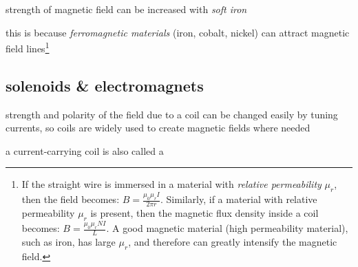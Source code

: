 \cmt strength of magnetic field can be increased with \emph{soft iron}

this is because \emph{ferromagnetic materials} (iron, cobalt, nickel) can attract magnetic field lines\footnote{If the straight wire is immersed in a material with \emph{relative permeability} $\mu_r$, then the field becomes: $B=\frac{\mu_0 \mu_r I}{2\pi r}$. Similarly, if a material with relative permeability $\mu_r$ is present, then the magnetic flux density inside a coil becomes: $B=\frac{\mu_0 \mu_r NI}{L}$. A good magnetic material (high permeability material), such as iron, has large $\mu_r$, and therefore can greatly intensify the magnetic field. \piste}

\subsection{solenoids \& electromagnets}

strength and polarity of the field due to a coil can be changed easily by tuning currents, so coils are widely used to create magnetic fields where needed

a current-carrying coil is also called a 

